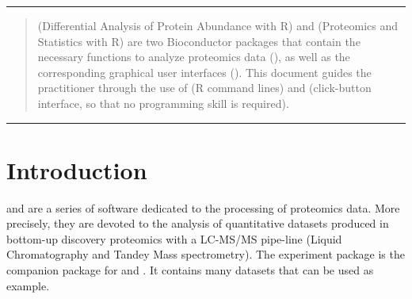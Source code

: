 \documentclass[12pt]{article}
\author{
Samuel Wieczorek$^\ast$,
Florence Combes$^\ast$,
and Thomas Burger$^\ast$\\
$^\ast$\url{firstname.lastname@cea.fr}
}
\begin{document}


\maketitle



\hrule
\begin{abstract}
 (Differential Analysis of Protein Abundance with R) and 
 (Proteomics and Statistics with R) are two Bioconductor 
packages that contain the necessary functions to analyze proteomics data 
(), as well as the corresponding graphical user interfaces 
(). This document guides the practitioner through the use of
 (R command lines) and  (click-button 
interface, so that no programming skill is required).
\end{abstract}
\hrule
{}

\newpage
\tableofcontents
\newpage

\section{Introduction}\label{sec:intro}



 and  are a series of software dedicated to 
the processing of proteomics data. More precisely, they are devoted to the 
analysis of quantitative datasets produced in bottom-up discovery proteomics 
with a LC-MS/MS pipe-line (Liquid Chromatography and Tandey Mass 
spectrometry). The experiment package  is 
the companion package for  and . It contains 
many datasets that can be used as example.\newline
\end{document}
